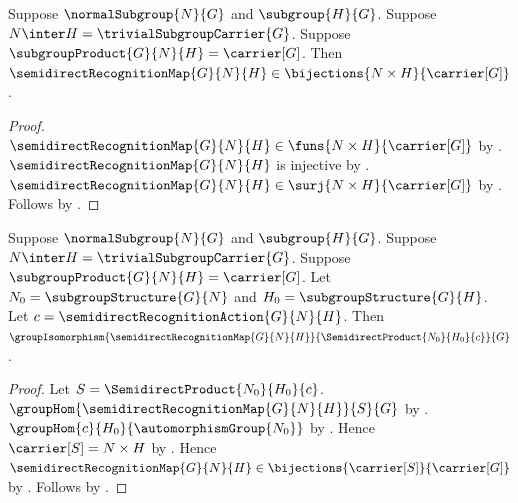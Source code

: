 \begin{theorem}\label{semidirect_recognition_map_bijection}
    Suppose $\normalSubgroup{N}{G}$ and $\subgroup{H}{G}$.
    Suppose $N\inter H=\trivialSubgroupCarrier{G}$.
    Suppose $\subgroupProduct{G}{N}{H}=\carrier[G]$.
    Then $\semidirectRecognitionMap{G}{N}{H}\in
        \bijections{N\times H}{\carrier[G]}$.
\end{theorem}
\begin{proof}
    $\semidirectRecognitionMap{G}{N}{H}\in
        \funs{N\times H}{\carrier[G]}$ by
        .
    $\semidirectRecognitionMap{G}{N}{H}$ is injective by
        .
    $\semidirectRecognitionMap{G}{N}{H}\in
        \surj{N\times H}{\carrier[G]}$ by
        .
    Follows by .
\end{proof}

\begin{theorem}\label{semidirect_recognition_isomorphism}
    Suppose $\normalSubgroup{N}{G}$ and $\subgroup{H}{G}$.
    Suppose $N\inter H=\trivialSubgroupCarrier{G}$.
    Suppose $\subgroupProduct{G}{N}{H}=\carrier[G]$.
    Let $N_0=\subgroupStructure{G}{N}$ and
        $H_0=\subgroupStructure{G}{H}$.
    Let $c=\semidirectRecognitionAction{G}{N}{H}$.
    Then
        $\groupIsomorphism{\semidirectRecognitionMap{G}{N}{H}}
            {\SemidirectProduct{N_0}{H_0}{c}}{G}$.
\end{theorem}
\begin{proof}
    Let $S=\SemidirectProduct{N_0}{H_0}{c}$.
    $\groupHom{\semidirectRecognitionMap{G}{N}{H}}{S}{G}$ by
        .
    $\groupHom{c}{H_0}{\automorphismGroup{N_0}}$ by
        .
    Hence $\carrier[S]=N\times H$ by
        .
    Hence $\semidirectRecognitionMap{G}{N}{H}\in
        \bijections{\carrier[S]}{\carrier[G]}$ by
        .
    Follows by .
\end{proof}
